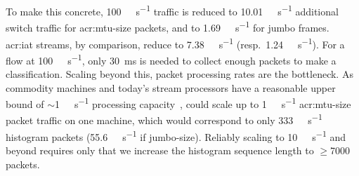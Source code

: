 To make this concrete, \qty{100}{\giga\bit\per\second} traffic is reduced to \qty{10.01}{\mega\bit\per\second} additional switch traffic for \gls{acr:mtu}-size packets, and to \qty{1.69}{\mega\bit\per\second} for jumbo frames.
\gls{acr:iat} streams, by comparison, reduce to \qty{7.38}{\giga\bit\per\second} (resp.\ \qty{1.24}{\giga\bit\per\second}).
For a flow at \qty{100}{\mega\bit\per\second}, only \qty{30}{\milli\second} is needed to collect enough packets to make a classification.
Scaling beyond this, packet processing rates are the bottleneck.
As commodity machines and today's stream processors have a reasonable upper bound of $\sim$\qty[per-symbol=p,sticky-per=true]{1}{\mega\packet\per\second} processing capacity~\parencite{DBLP:conf/sigcomm/GuptaHCFRW18}, \seidr{} could scale up to \qty{1}{\tera\bit\per\second} \gls{acr:mtu}-size packet traffic on one machine, which would correspond to only \qty[per-symbol=p,sticky-per=true]{333}{\kilo\packet\per\second} histogram packets (\qty[per-symbol=p,sticky-per=true]{55.6}{\kilo\packet\per\second} if jumbo-size).
Reliably scaling to \qty{10}{\tera\bit\per\second} and beyond requires only that we increase the histogram sequence length to $\ge$\num{7000} packets.

